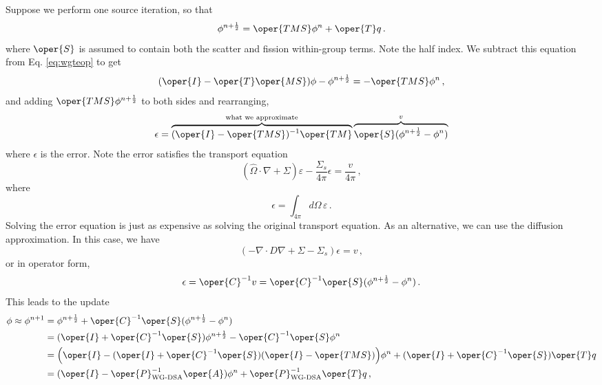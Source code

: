 Suppose we perform one source iteration, so that
\begin{equation}
  \phi^{n+\frac{1}{2}} = \oper{TMS} \phi^{n} + \oper{T}q \, .
\end{equation}
where $\oper{S}$ is assumed to contain both the 
scatter and fission within-group terms.
 Note the half index.  We subtract this equation 
from Eq. \ref{eq:wgteop} to get
\begin{equation}
 (\oper{I} - \oper{T}\oper{MS})\phi- \phi^{n+\frac{1}{2}} = 
   -\oper{TMS} \phi^{n} \, ,
\end{equation}
and adding $\oper{TMS} \phi^{n+\frac{1}{2}}$ to both 
sides and rearranging, 
\begin{equation}
 \epsilon = \overbrace{ ( \oper{I} - \oper{TMS})^{-1}\oper{T M} }^
                      {\text{what we approximate}}
            \overbrace{\oper{S} (\phi^{n+\frac{1}{2}}- \phi^{n})}^{v}
\label{eq:erroreq}
\end{equation}
where $\epsilon$ is the error.  Note the error satisfies the 
transport equation
\begin{equation}
 (\hat{\Omega} \cdot \nabla  + \Sigma) \varepsilon - 
   \frac{\Sigma_s}{4\pi} \epsilon =  \frac{v}{4\pi} \, ,
\end{equation}
where
\begin{equation}
 \epsilon = \int_{4\pi} d\Omega \, \varepsilon \, .
\end{equation}
Solving the error equation is just as expensive as solving the 
original transport equation.  As an alternative, we can use the 
diffusion approximation.  In this case, we have
\begin{equation}
 (-\nabla \cdot D \nabla + \Sigma - \Sigma_s) \epsilon = v \, ,
\end{equation}
or in operator form,
\begin{equation}
  \epsilon = \oper{C}^{-1} v = 
    \oper{C}^{-1} \oper{S} (\phi^{n+\frac{1}{2}}- \phi^{n}) \, .
\end{equation}
This leads to the update
\begin{equation}
\begin{split}
 \phi \approx \phi^{n+1} 
   &= \phi^{n+\frac{1}{2}} + 
      \oper{C}^{-1} \oper{S} (\phi^{n+\frac{1}{2}}- \phi^{n}) \\
   &= (\oper{I} + \oper{C}^{-1} \oper{S}) \phi^{n+\frac{1}{2}} - 
        \oper{C}^{-1} \oper{S} \phi^{n} \\
   &= \Big (\oper{I} - (\oper{I} + \oper{C}^{-1} \oper{S}) 
        ( \oper{I} -\oper{TMS}  ) \Big ) \phi^{n} 
       +  (\oper{I} + \oper{C}^{-1} \oper{S})\oper{T}q \\
   &= (\oper{I} - \oper{P}_{\text{WG-DSA}}^{-1}\oper{A}) \phi^{n} + 
        \oper{P}^{-1}_{\text{WG-DSA}}  \oper{T}q \, ,
\end{split}
\end{equation}
